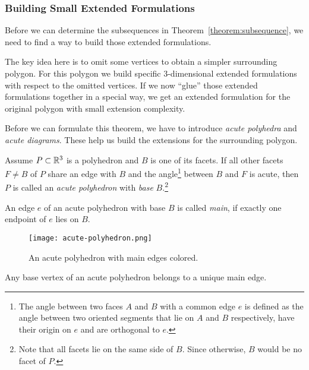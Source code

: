 \subsubsection{Building Small Extended Formulations}

Before we can determine the subsequences in Theorem~\ref{theorem:subsequence}, we need to find a way to build those extended formulations.

The key idea here is to omit some vertices to obtain a simpler surrounding polygon. For this polygon we build specific 3-dimensional extended formulations with respect to the omitted vertices. If we now ``glue'' those extended formulations together in a special way, we get an extended formulation for the original polygon with small extension complexity.

Before we can formulate this theorem, we have to introduce \emph{acute polyhedra} and \emph{acute diagrams}. These help us build the extensions for the surrounding polygon.

\begin{definition}\label{definition:acute-polyhedron}
  Assume $P \subset \mathbb{R}^3$ is a polyhedron and $B$ is one of its facets. If all other facets $F \neq B$ of $P$ 
  share an edge with $B$ and
  the angle\footnote{The angle between two faces $A$ and $B$ with a common edge $e$ is defined as the angle between two oriented segments that lie on $A$ and $B$ respectively, have their origin on $e$ and are orthogonal to $e$.} between $B$ and $F$ is acute,
  then $P$ is called an \emph{acute polyhedron} with \emph{base} $B$.\footnote{Note that all facets lie on the same side of $B$. Since otherwise, $B$ would be no facet of $P$.}
\end{definition}

\begin{definition}
  An edge $e$ of an acute polyhedron with base $B$ is called \emph{main}, if exactly one endpoint of $e$ lies on $B$.
\end{definition}

\begin{figure}[ht]
  \centering
  \texttt{[image: acute-polyhedron.png]}
  \caption{An acute polyhedron with main edges colored.}
  \label{fig:acute-polyhedron}
\end{figure}

\begin{lemma}
  Any base vertex of an acute polyhedron belongs to a unique main edge.
\end{lemma}

